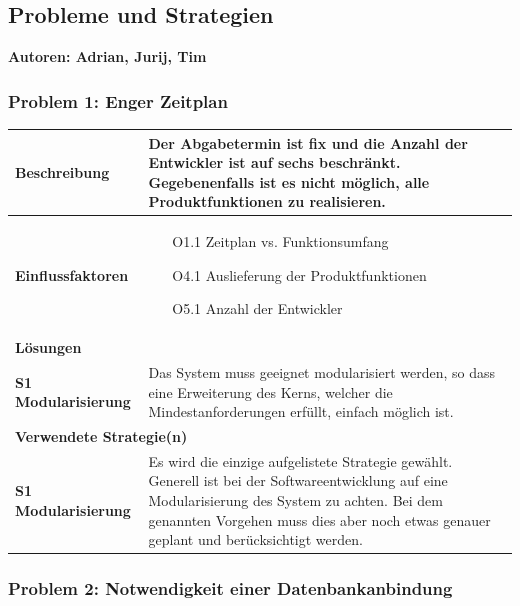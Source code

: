 \documentclass[fontsize=12pt,paper=a4,twoside]{scrartcl}
\begin{document}
\newpage
\subsection{Probleme und Strategien}
\textbf{Autoren: Adrian, Jurij, Tim}\\
\label{sec:strategien}

\subsubsection{Problem 1: Enger Zeitplan}
\begin{tabularx}{\textwidth}{|p{6cm}|X|}
 \hline
 \textbf{Beschreibung} & Der Abgabetermin ist fix und die Anzahl der Entwickler ist auf sechs beschränkt. Gegebenenfalls ist es nicht möglich, alle Produktfunktionen zu realisieren.\\\hline
 \textbf{Einflussfaktoren} &
 \begin{itemize}
 \item[O1.1] Zeitplan vs. Funktionsumfang
 \item[O4.1] Auslieferung der Produktfunktionen
 \item[O5.1] Anzahl der Entwickler
 \end{itemize}\\\hline
\multicolumn{2}{|l|}{\textbf{Lösungen}} \\\hline
\textbf{S1 Modularisierung} & Das System muss geeignet modularisiert werden, so dass eine Erweiterung des Kerns, welcher die Mindestanforderungen erfüllt, einfach möglich ist. \\\hline

\multicolumn{2}{|l|}{\textbf{Verwendete Strategie(n)}} \\\hline
 \textbf{S1 Modularisierung}
    & Es wird die einzige aufgelistete Strategie gewählt. Generell ist bei der Softwareentwicklung auf eine Modularisierung des System zu achten. Bei dem genannten Vorgehen muss dies aber noch etwas genauer geplant und berücksichtigt werden. \\\hline
\end{tabularx}

\newpage

\subsubsection{Problem 2: Notwendigkeit einer Datenbankanbindung}
\end{document}
